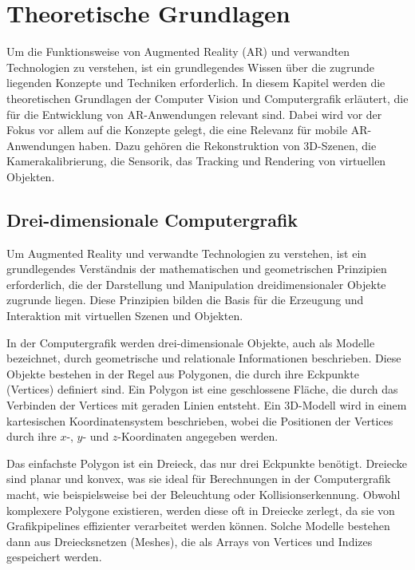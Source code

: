 \chapter{Theoretische Grundlagen}

Um die Funktionsweise von Augmented Reality (AR) und verwandten Technologien zu verstehen, ist ein grundlegendes Wissen über die zugrunde liegenden Konzepte und Techniken erforderlich. In diesem Kapitel werden die theoretischen Grundlagen der Computer Vision und Computergrafik erläutert, die für die Entwicklung von AR-Anwendungen relevant sind. Dabei wird vor der Fokus vor allem auf die Konzepte gelegt, die eine Relevanz für mobile AR-Anwendungen haben. Dazu gehören die Rekonstruktion von 3D-Szenen, die Kamerakalibrierung, die Sensorik, das Tracking und Rendering von virtuellen Objekten.

\section{Drei-dimensionale Computergrafik}

Um Augmented Reality und verwandte Technologien zu verstehen, ist ein grundlegendes Verständnis der mathematischen und geometrischen Prinzipien erforderlich, die der Darstellung und Manipulation dreidimensionaler Objekte zugrunde liegen. Diese Prinzipien bilden die Basis für die Erzeugung und Interaktion mit virtuellen Szenen und Objekten. 

In der Computergrafik werden drei-dimensionale Objekte, auch als Modelle bezeichnet, durch geometrische und relationale Informationen beschrieben. Diese Objekte bestehen in der Regel aus Polygonen, die durch ihre Eckpunkte (Vertices) definiert sind. Ein Polygon ist eine geschlossene Fläche, die durch das Verbinden der Vertices mit geraden Linien entsteht. Ein 3D-Modell wird in einem kartesischen Koordinatensystem beschrieben, wobei die Positionen der Vertices durch ihre \(x\)-, \(y\)- und \(z\)-Koordinaten angegeben werden.

Das einfachste Polygon ist ein Dreieck, das nur drei Eckpunkte benötigt. Dreiecke sind planar und konvex, was sie ideal für Berechnungen in der Computergrafik macht, wie beispielsweise bei der Beleuchtung oder Kollisionserkennung. Obwohl komplexere Polygone existieren, werden diese oft in Dreiecke zerlegt, da sie von Grafikpipelines effizienter verarbeitet werden können. Solche Modelle bestehen dann aus Dreiecksnetzen (Meshes), die als Arrays von Vertices und Indizes gespeichert werden.

